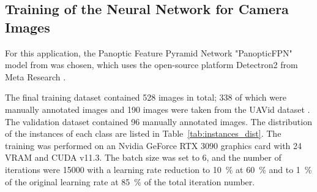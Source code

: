 \documentclass[conference]{IEEEtran}
\begin{document}
\subsection{Training of the Neural Network for Camera Images}

For this application, the Panoptic Feature Pyramid Network "PanopticFPN" model from \cite{b16} was chosen, which uses the open-source platform Detectron2 from Meta Research \cite{b17}.

The final training dataset contained \num{528} images in total; \num{338} of which were manually annotated images and \num{190} images were taken from the UAVid dataset \cite{b18}.
The validation dataset contained 96 manually annotated images.
The distribution of the instances of each class are listed in Table~\ref{tab:instances_dist}.
The training was performed on an Nvidia GeForce RTX 3090 graphics card with \SI{24}{\giga\byte} VRAM and CUDA v11.3.
The batch size was set to 6, and the number of iterations were \num{15000} with a learning rate reduction to \SI{10}{\percent} at \SI{60}{\percent} and to \SI{1}{\percent} of the original learning rate at \SI{85}{\percent} of the total iteration number.
\end{document}
